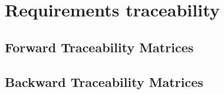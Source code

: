 \documentclass[Main]{subfiles}
\begin{document}
\chapter{Requirements traceability}
\section{Forward Traceability Matrices}




\section{Backward Traceability Matrices}
\end{document}

